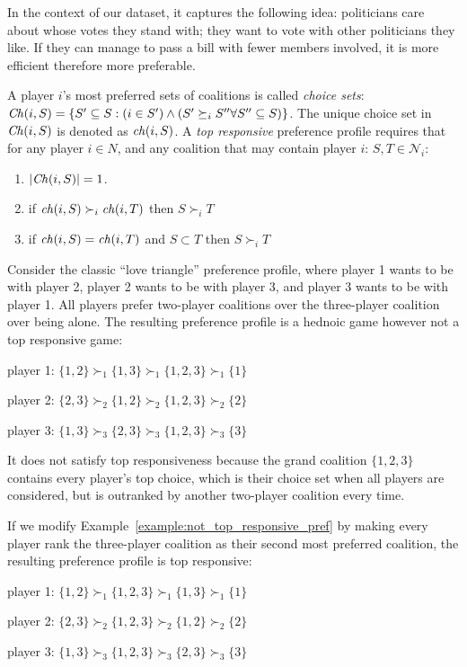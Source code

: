 In the context of our dataset, it captures the following idea:
politicians care about whose votes they stand with;
they want to vote with other politicians they like.
If they can manage to pass a bill with fewer members involved,
it is more efficient therefore more preferable.

A player $i$'s most preferred sets of coalitions is called \textit{choice sets}:
$\mathit{Ch}(i, S) = \{S' \subseteq S: (i \in S') \wedge (S' \succeq_i S'' \forall S'' \subseteq S)\}$.
The unique choice set in $\mathit{Ch}(i, S)$ is denoted as $\mathit{ch}(i, S)$.
A {\em top responsive} preference profile requires that for any player $i \in N$,
and any coalition that may contain player $i$: $S, T \in \mathcal{N}_i$:
\begin{enumerate}
  \item $|\mathit{Ch}(i, S)| = 1$.
  \item if $\mathit{ch}(i, S) \succ_i \mathit{ch}(i, T)$ then $S \succ_i T$
  \item if $\mathit{ch}(i, S) = \mathit{ch}(i, T)$ and $S \subset T$ then $S \succ_i T$
\end{enumerate}

\begin{example}
\label{example:not_top_responsive_pref}
  Consider the classic ``love triangle'' preference profile, where player 1 wants
  to be with player 2, player 2 wants to be with player 3, and player 3 wants to
  be with player 1. All players prefer two-player coalitions over the three-player
  coalition over being alone.
  The resulting preference profile is a hednoic game however not a top responsive
  game:

  player 1: $\{1, 2\} \succ_1 \{1, 3\} \succ_1 \{1, 2, 3\} \succ_1  \{1\}$

  player 2: $\{2, 3\} \succ_2 \{1, 2\} \succ_2 \{1, 2, 3\} \succ_2  \{2\}$

  player 3: $\{1, 3\} \succ_3 \{2, 3\} \succ_3 \{1, 2, 3\} \succ_3  \{3\}$

  It does not satisfy top responsiveness because the grand coalition $\{1, 2, 3\}$
  contains every player's top choice, which is their choice set when all players
  are considered, but is outranked by another two-player coalition every time.
\end{example}

\begin{example}
\label{example:top_responsive_pref}
  If we modify Example~\ref{example:not_top_responsive_pref} by making every player
  rank the three-player coalition as their second most preferred coalition, the
  resulting preference profile is top responsive:

  player 1: $\{1, 2\} \succ_1 \{1, 2, 3\} \succ_1 \{1, 3\} \succ_1  \{1\}$

  player 2: $\{2, 3\} \succ_2 \{1, 2, 3\} \succ_2 \{1, 2\} \succ_2  \{2\}$

  player 3: $\{1, 3\} \succ_3 \{1, 2, 3\} \succ_3 \{2, 3\} \succ_3  \{3\}$

\end{example}

